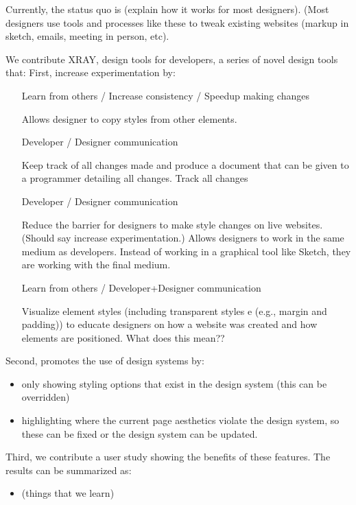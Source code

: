 \documentclass{sigchi-ext}
\begin{document}
Currently, the status quo is (explain how it works for most designers). (Most designers use tools and processes like these to tweak existing websites (markup in sketch, emails, meeting in person, etc). 

We contribute XRAY, design tools for developers, a series of novel design tools that:
First, increase experimentation by: 
\begin{itemize}
    \item [Learn from others / Increase consistency / Speedup making changes] 
    
    Allows designer to copy styles from other elements. 
    \item [Developer / Designer communication] 
    
    Keep track of all changes made and produce a document that can be given to a programmer detailing all changes. Track all changes
    \item[Developer / Designer communication] 
    
    Reduce the barrier for designers to make style changes on live websites. (Should say increase experimentation.) Allows designers to work in the same medium as developers. Instead of working in a graphical tool like Sketch, they are working with the final medium.
    \item[Learn from others / Developer+Designer communication] 
    
    Visualize element styles (including transparent styles e (e.g., margin and padding)) to educate designers on how a website was created and how elements are positioned. What does this mean??
\end{itemize}


Second, promotes the use of design systems by: 
\begin{itemize}
    \item only showing styling options that exist in the design system (this can be overridden) 
    \item highlighting where the current page aesthetics violate the design system, so these can be fixed or the design system can be updated.
\end{itemize}{}

Third, we contribute a user study showing the benefits of these features. The results can be summarized as: 
\begin{itemize}
    \item (things that we learn)
\end{itemize}
\end{document}
